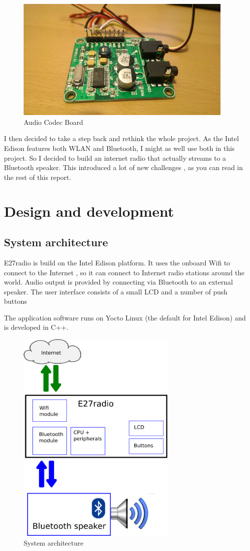 \documentclass[12pt,a4paper]{scrreprt}
\begin{document}
\begin{figure}[h]
	\includegraphics[width=400px]{images/audio1}
	\caption{Audio Codec Board}
\end{figure}

I then decided to take a step back and rethink the whole project.
As the Intel Edison features both WLAN and Bluetooth, I might as well use both in this project. 
So I decided to build an internet radio that actually streams to a Bluetooth speaker. This introduced a lot of new challenges , as you can read in the rest of this report.


\chapter{Design and development}


\section{System architecture}
E27radio is build on the Intel Edison platform.
It uses the onboard Wifi to connect to the Internet , so it can connect to Internet radio stations around the world. Audio output is provided by connecting via Bluetooth to an external speaker.
The user interface consists of a small LCD and a number of push buttons

The application software runs on Yocto Linux (the default for Intel Edison) and is developed in C++.

\begin{figure}[h]
	\includegraphics[height=400px]{images/architecture}
	\caption{System architecture}
\end{figure}
\end{document}
